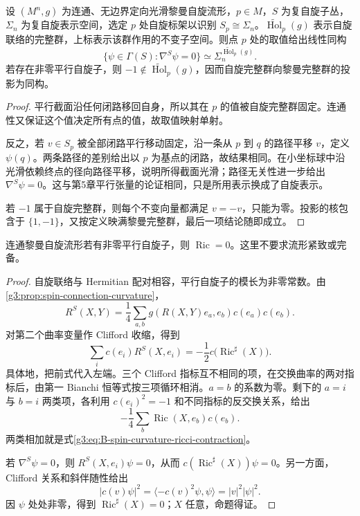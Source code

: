 \begin{proposition}\label{g3:prop:B-parallel-spinor-holonomy}
 设 \((M^n,g)\) 为连通、无边界定向光滑黎曼自旋流形，\(p\in M\)，\(S\) 为复自旋子丛，\(\Sigma_n\) 为复自旋表示空间，选定 \(p\) 处自旋标架以识别 \(S_p\cong\Sigma_n\)。\(\widetilde{\operatorname{Hol}}_p(g)\) 表示自旋联络的完整群，上标表示该群作用的不变子空间。则点 \(p\) 处的取值给出线性同构
 \begin{equation}\label{g3:eq:B-spin-holonomy-invariants}
  \{\psi\in\Gamma(S):\nabla^S\psi=0\}
    \simeq \Sigma_n^{\widetilde{\operatorname{Hol}}_p(g)}.
 \end{equation}
 若存在非零平行自旋子，则 \(-1\notin\widetilde{\operatorname{Hol}}_p(g)\)，因而自旋完整群向黎曼完整群的投影为同构。
\end{proposition}
\begin{proof}
 平行截面沿任何闭路移回自身，所以其在 \(p\) 的值被自旋完整群固定。连通性又保证这个值决定所有点的值，故取值映射单射。

 反之，若 \(v\in S_p\) 被全部闭路平行移动固定，沿一条从 \(p\) 到 \(q\) 的路径平移 \(v\)，定义 \(\psi(q)\)。两条路径的差别给出以 \(p\) 为基点的闭路，故结果相同。在小坐标球中沿光滑依赖终点的径向路径平移，说明所得截面光滑；路径无关性进一步给出 \(\nabla^S\psi=0\)。这与第5章平行张量的论证相同，只是所用表示换成了自旋表示。

 若 \(-1\) 属于自旋完整群，则每个不变向量都满足 \(v=-v\)，只能为零。投影的核包含于 \(\{1,-1\}\)，又按定义映满黎曼完整群，最后一项结论随即成立。
\end{proof}

\begin{proposition}\label{g3:prop:B-parallel-spinor-ricci-flat}
 连通黎曼自旋流形若有非零平行自旋子，则 \(\operatorname{Ric}=0\)。这里不要求流形紧致或完备。
\end{proposition}
\begin{proof}
 自旋联络与 Hermitian 配对相容，平行自旋子的模长为非零常数。由\cref{g3:prop:spin-connection-curvature}，
 \[
  R^S(X,Y)=\frac14\sum_{a,b}
      g(R(X,Y)e_a,e_b)c(e_a)c(e_b).
 \]
 对第二个曲率变量作 Clifford 收缩，得到
 \begin{equation}\label{g3:eq:B-spin-curvature-ricci-contraction}
  \sum_i c(e_i)R^S(X,e_i)
       =-\frac12 c\bigl(\operatorname{Ric}^{\sharp}(X)\bigr).
 \end{equation}
 具体地，把前式代入左端。三个 Clifford 指标互不相同的项，在交换曲率的两对指标后，由第一 Bianchi 恒等式按三项循环相消。\(a=b\) 的系数为零。剩下的 \(a=i\) 与 \(b=i\) 两类项，各利用 \(c(e_i)^2=-1\) 和不同指标的反交换关系，给出
 \[
  -\frac14\sum_b\operatorname{Ric}(X,e_b)c(e_b).
 \]
 两类相加就是式\eqref{g3:eq:B-spin-curvature-ricci-contraction}。

 若 \(\nabla^S\psi=0\)，则 \(R^S(X,e_i)\psi=0\)，从而 \(c(\operatorname{Ric}^{\sharp}(X))\psi=0\)。另一方面，Clifford 关系和斜伴随性给出
 \[
  |c(v)\psi|^2=\langle-c(v)^2\psi,\psi\rangle
       =|v|^2|\psi|^2.
 \]
 因 \(\psi\) 处处非零，得到 \(\operatorname{Ric}^{\sharp}(X)=0\)；\(X\) 任意，命题得证。
\end{proof}

